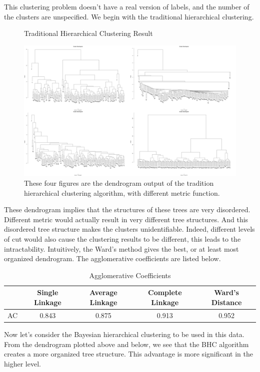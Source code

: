 This clustering problem doesn't have a real version of labels, and the number of the clusters are unspecified. We begin with the traditional hierarchical clustering.

\begin{figure}[H]
    \caption{Traditional Hierarchical Clustering Result}
\includegraphics[width=\textwidth]{00003f.png}
\caption*{These four figures are the dendrogram output of the tradition hierarchical clustering algorithm, with different metric function.}
\end{figure}
These dendrogram implies that the structures of these trees are very disordered. Different metric would actually result in very different tree structures. And this disordered tree structure makes the clusters unidentifiable. Indeed, different levels of cut would also cause the clustering results to be different, this leads to the intractability. Intuitively, the Ward's method gives the best, or at least most organized dendrogram. The agglomerative coefficients are listed below.
\begin{table}[H]
    \caption{Agglomerative Coefficients}
    \begin{tabular}{l|cccc}
                                                  & Single Linkage & Average Linkage & Complete Linkage & Ward's Distance \\\hline
    AC & 0.843          & 0.875           & 0.913            & 0.952          
    \end{tabular}
    \end{table}
Now let's consider the Bayesian hierarchical clustering to be used in this data. From the dendrogram plotted above and below, we see that the BHC algorithm creates a more organized tree structure. This advantage is more significant in the higher level.
\newpage

